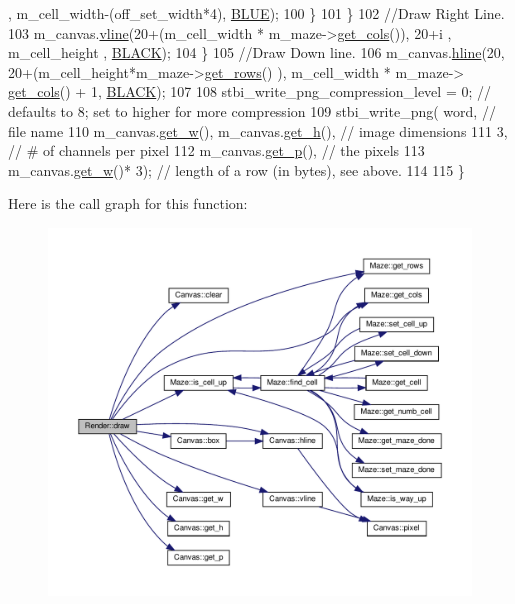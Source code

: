 \begin{DoxyCode}
      , m\_cell\_width-(off\_set\_width*4), \hyperlink{render_8cpp_ab49b84fe87ce8b46e7e4a25be82c7538}{BLUE});         
100             \}
101         \}
102         \textcolor{comment}{//Draw Right Line.}
103         m\_canvas.\hyperlink{classCanvas_af81ae19142bc132665e053ce5de15211}{vline}(20+(m\_cell\_width * m\_maze->\hyperlink{classMaze_a8a04cd1335e96a80358181afa164d4c9}{get\_cols}()), 20+i , m\_cell\_height , 
      \hyperlink{render_8cpp_ada1558ae37a1ddfc6c8b784f809385d4}{BLACK});
104     \}
105     \textcolor{comment}{//Draw Down line.}
106     m\_canvas.\hyperlink{classCanvas_a3095d5ff2670c5dc9939454198865ceb}{hline}(20, 20+(m\_cell\_height*m\_maze->\hyperlink{classMaze_ac786606a34632b2254b2d27d5f5f0f3f}{get\_rows}() ), m\_cell\_width * m\_maze->
      \hyperlink{classMaze_a8a04cd1335e96a80358181afa164d4c9}{get\_cols}() + 1, \hyperlink{render_8cpp_ada1558ae37a1ddfc6c8b784f809385d4}{BLACK});
107 
108     stbi\_write\_png\_compression\_level = 0;    \textcolor{comment}{// defaults to 8; set to higher for more compression}
109     stbi\_write\_png( word,            \textcolor{comment}{// file name}
110             m\_canvas.\hyperlink{classCanvas_a8478392f133ddaf1c9b7272a301c7898}{get\_w}(), m\_canvas.\hyperlink{classCanvas_ab26c7ab91a0a9069895285a314bc8418}{get\_h}(),           \textcolor{comment}{// image dimensions}
111             3,                              \textcolor{comment}{// # of channels per pixel}
112             m\_canvas.\hyperlink{classCanvas_aa9f9b173d57058ea827a0134c937d0e1}{get\_p}(),                      \textcolor{comment}{// the pixels}
113             m\_canvas.\hyperlink{classCanvas_a8478392f133ddaf1c9b7272a301c7898}{get\_w}()* 3);                 \textcolor{comment}{// length of a row (in bytes), see above.}
114 
115 \}
\end{DoxyCode}
Here is the call graph for this function\+:\nopagebreak
\begin{figure}[H]
\begin{center}
\leavevmode
\includegraphics[width=350pt]{classRender_a67e9fdbd6725960fd59d6350e8cd17cc_cgraph}
\end{center}
\end{figure}
